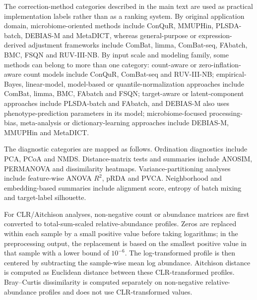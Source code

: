 \documentclass[11pt,letterpaper]{article}
\begin{document}
The correction-method categories described in the main text are used as practical implementation labels rather than as a ranking system. By original application domain, microbiome-oriented methods include ConQuR, MMUPHin, PLSDA-batch, DEBIAS-M and MetaDICT, whereas general-purpose or expression-derived adjustment frameworks include ComBat, limma, ComBat-seq, FAbatch, BMC, FSQN and RUV-III-NB. By input scale and modeling family, some methods can belong to more than one category: count-aware or zero-inflation-aware count models include ConQuR, ComBat-seq and RUV-III-NB; empirical-Bayes, linear-model, model-based or quantile-normalization approaches include ComBat, limma, BMC, FAbatch and FSQN; target-aware or latent-component approaches include PLSDA-batch and FAbatch, and DEBIAS-M also uses phenotype-prediction parameters in its model; microbiome-focused processing-bias, meta-analysis or dictionary-learning approaches include DEBIAS-M, MMUPHin and MetaDICT.

The diagnostic categories are mapped as follows. Ordination diagnostics include PCA, PCoA and NMDS. Distance-matrix tests and summaries include ANOSIM, PERMANOVA and dissimilarity heatmaps. Variance-partitioning analyses include feature-wise ANOVA $R^2$, pRDA and PVCA. Neighborhood and embedding-based summaries include alignment score, entropy of batch mixing and target-label silhouette.

For CLR/Aitchison analyses, non-negative count or abundance matrices are first converted to total-sum-scaled relative-abundance profiles. Zeros are replaced within each sample by a small positive value before taking logarithms; in the preprocessing output, the replacement is based on the smallest positive value in that sample with a lower bound of $10^{-6}$. The log-transformed profile is then centered by subtracting the sample-wise mean log abundance. Aitchison distance is computed as Euclidean distance between these CLR-transformed profiles. Bray--Curtis dissimilarity is computed separately on non-negative relative-abundance profiles and does not use CLR-transformed values.
\end{document}
